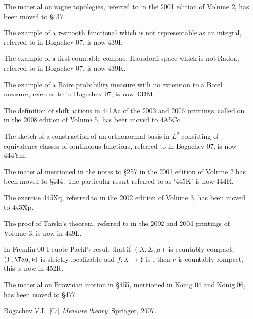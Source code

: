  The material on vague topologies,
referred to in the 2001 edition of Volume 2, has been moved to \S437.

 The example of a $\tau$-smooth
functional which is not representable as an integral, referred to in
{\smc Bogachev 07}, is now 439I.

 The example of a first-countable compact
Hausdorff space which is not Radon,
referred to in {\smc Bogachev 07}, is now 
439K.

 The example of a Baire probability measure
with no extension to a Borel measure, 
referred to in {\smc Bogachev 07}, is now 439M.

 The definition of shift actions in 4{}41Ac
of the 2003 and 2006 printings, called on in the 2008 edition of Volume 5,
has been moved to 4A5Cc.
     
 The sketch of a construction of an
orthonormal basis in $L^2$ consisting of equivalence classes of continuous
functions, referred to in {\smc Bogachev 07}, is now 444Ym.

 The material mentioned in
the notes to \S257 in the 2001 edition of Volume 2 has been moved to
\S444.   The particular result referred to as `4{}45K' is now 444R.
     
 The exercise 4{}45Xq, referred to in the
2002 edition of Volume 3, %
has been moved to 445Xp.
     
 The proof of Tarski's theorem,
referred to in the 2002 and 2004 printings of Volume 3, is now in 449L.     

 In {\smc Fremlin 00} I quote Pachl's result that if 
$(X,\Sigma,\mu)$ is countably compact,
$(Y,\Tau,\nu)$ is strictly localizable and $f:X\to Y$ is \imp, then 
$\nu$ is countably compact;  this is now in 452R.
     
 The material on Brownian motion in \S4{}55, 
mentioned in {\smc K\"onig 04} and {\smc K\"onig 06},
has been moved to \S477.

\bigskip


\medskip

Bogachev V.I.\ [07] {\it Measure theory.}  Springer, 2007.

